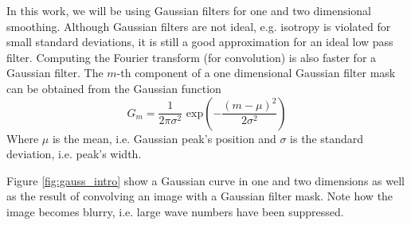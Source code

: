 		In this work, we will be using Gaussian filters for one and two dimensional smoothing. Although Gaussian filters are not ideal, e.g. isotropy is violated for small standard deviations, it is still a good approximation for an ideal low pass filter. Computing the Fourier transform (for convolution) is also faster for a Gaussian filter. The $m$-th component of a one dimensional Gaussian filter mask can be obtained from the Gaussian function
		\begin{equation}
		G_{m} = \dfrac{1}{2 \pi \sigma^2} \text{ exp}
			 \left( 
			 	- \dfrac{(m-\mu)^2}{2 \sigma^2}
			 \right)
		\end{equation}
		Where $\mu$ is the mean, i.e. Gaussian peak's position and $\sigma$ is the standard deviation, i.e. peak's width.
		
		Figure \ref{fig:gauss_intro} show a Gaussian curve in one and two dimensions as well as the result of convolving an image with a Gaussian filter mask. Note how the image becomes blurry, i.e. large wave numbers have been suppressed.
